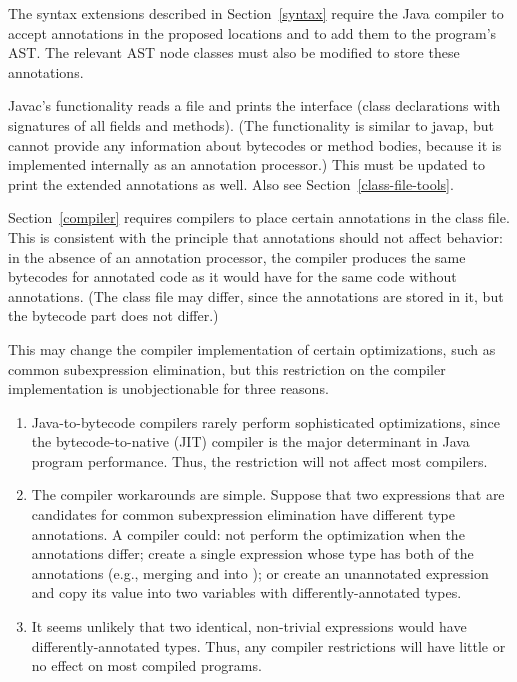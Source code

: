 \documentclass[10pt]{article}
\begin{document}
The syntax extensions described in Section~\ref{syntax}
require the Java compiler to accept annotations in the proposed
locations and to add them to the program's AST\@.  The relevant AST node
classes must also be modified to store these annotations.


Javac's  functionality reads a  file and prints
the interface (class declarations with signatures of all fields and
methods).  (The  functionality is similar to javap, but
cannot provide
any information about bytecodes or method bodies, because it is implemented
internally as an annotation processor.)
This must be updated to print the extended annotations as well.
Also see Section~\ref{class-file-tools}.


Section~\ref{compiler} requires compilers to place certain annotations
in the class file.  This is consistent with the principle that annotations
should not affect behavior:  in the absence of an annotation processor, the
compiler produces the same bytecodes for annotated code as it would have
for the same code without annotations.  (The class file may differ, since
the annotations are stored in it, but the bytecode part does not differ.)

This may change the compiler implementation of certain optimizations, such
as common subexpression elimination, but this restriction on the compiler
implementation is unobjectionable for three reasons.
\begin{enumerate}
\item
Java-to-bytecode compilers rarely perform sophisticated
optimizations, since the bytecode-to-native (JIT) compiler is the major
determinant in Java program performance.  Thus, the restriction will not
affect most compilers.
\item
The compiler workarounds are simple.  Suppose that two expressions
that are candidates for common subexpression elimination
have different type annotations.
A compiler could:  not perform the optimization when the annotations
differ; create a single expression whose type has both of the annotations
(e.g., merging  and 
into );
or create an unannotated expression and copy its value into two variables
with differently-annotated types.
% 
\item
It seems unlikely that two identical, non-trivial expressions would
have differently-annotated types.  Thus, any compiler restrictions will
have little or no effect on most compiled programs.
\end{enumerate}
\end{document}
